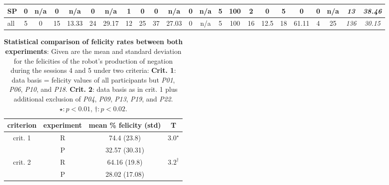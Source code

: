 \begin{screenonly}
\begin{table*}[h]
{{\begin{small}
\begin{tabular*}{\hsize}{@{\extracolsep{\fill}}lcccccccccccccccccccccc}
          SP & 0 & n/a & 0 & n/a & 0 & n/a & 1 & 0 & 0 & n/a & 0 & n/a & 5 & 100 & 2 & 0 & 5 & 0 & 0 & n/a & \emph{13} & \emph{38.46} \\
          \midrule
          all & 5 & 0 & 15 & 13.33 & 24 & 29.17 & 12 & 25 & 37 & 27.03 & 0 & n/a & 5 & 100 & 16 & 12.5 & 18 & 61.11 & 4 & 25 & \emph{136} & \emph{30.15} \\
          \bottomrule
        \end{tabular*}
      \end{small}
    }
  }
  \JoinCoffins{}\AccuFelTablePLast[t,l]
  \TypesetCoffin\AccuFelTableLast
\end{table*}
\begin{table}[h]
\caption{\textbf{Statistical comparison of felicity rates between both experiments}: Given are the mean and standard deviation for the felicities of the robot's
    production of negation during the sessions 4 and 5 under two criteria: \textbf{Crit. 1}: data basis = felicity values of all participants but \emph{P01},
    \emph{P06}, \emph{P10}, and \emph{P18}. \textbf{Crit. 2}: data basis as in crit. 1 plus additional exclusion of \emph{P04}, \emph{P09}, \emph{P13}, \emph{P19},
    and \emph{P22}. \ensuremath{\star: p < 0.01}, \ensuremath{\dagger: p < 0.02}.}
  \label{tbl:felicity_robot_stat}
  \setlength{\tabcolsep}{2.15ex}
  \begin{tabular}{cccc}
    \toprule
    criterion & experiment & mean \% felicity (std) & T \\
    \midrule
    \multirow{2}{*}{crit. 1} & R  & 74.4 (23.8) &  \multirow{2}{*}{$3.0^\star$}\\
              & P  & 32.57 (30.31) & \\
    \cmidrule{2-4}
    \multirow{2}{*}{crit. 2} & R  & 64.16 (19.8) & \multirow{2}{*}{$3.2^\dagger$} \\
              & P  & 28.02 (17.08) & \\
    \bottomrule
  \end{tabular}
\end{table}


\end{screenonly}
